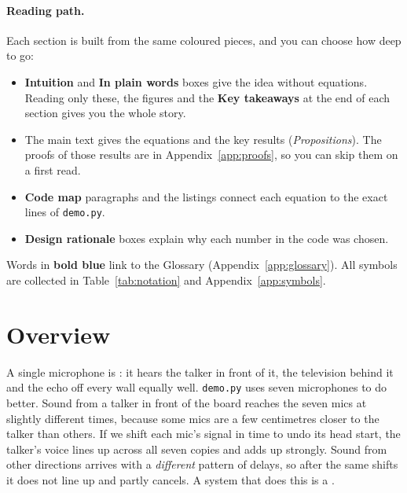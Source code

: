 \documentclass[11pt]{article}
\begin{document}
\paragraph{Reading path.} Each section is built from the same coloured pieces, and you can choose
how deep to go:
\begin{itemize}[nosep]
\item \textcolor{blue!50!black}{\textbf{Intuition}} and \textcolor{green!40!black}{\textbf{In plain
  words}} boxes give the idea without equations. Reading only these, the figures and the
  \textbf{Key takeaways} at the end of each section gives you the whole story.
\item The main text gives the equations and the key results (\emph{Propositions}). The proofs of
  those results are in Appendix~\ref{app:proofs}, so you can skip them on a first read.
\item \textbf{Code map} paragraphs and the listings connect each equation to the exact lines of
  \texttt{demo.py}.
\item \textcolor{orange!60!black}{\textbf{Design rationale}} boxes explain why each number in the
  code was chosen.
\end{itemize}
Words in \textbf{bold blue} link to the Glossary (Appendix~\ref{app:glossary}). All symbols are
collected in Table~\ref{tab:notation} and Appendix~\ref{app:symbols}.

\tableofcontents

\section{Overview}\label{sec:overview}

A single microphone is : it hears the talker in front of it, the
television behind it and the echo off every wall equally well. \texttt{demo.py} uses seven
microphones to do better. Sound from a talker in front of the board reaches the seven mics at
slightly different times, because some mics are a few centimetres closer to the talker than
others. If we shift each mic's signal in time to undo its head start, the talker's voice lines
up across all seven copies and adds up strongly. Sound from other directions arrives with a
\emph{different} pattern of delays, so after the same shifts it does not line up and partly
cancels. A system that does this is a .
\end{document}
